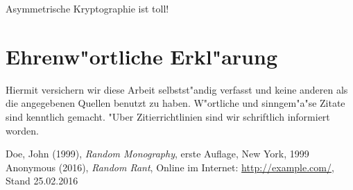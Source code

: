 \documentclass[a4paper, fontsize=12pt, toc=bibliographynumbered]{scrreprt}
\begin{document}
Asymmetrische Kryptographie ist toll!

\author{}
\chapter{Ehrenw"ortliche Erkl"arung}

Hiermit versichern wir diese Arbeit selbstst"andig verfasst und keine
anderen als die angegebenen Quellen benutzt zu haben.  W"ortliche und
sinngem"a"se Zitate sind kenntlich gemacht.  "Uber Zitierrichtlinien
sind wir schriftlich informiert worden.

\renewcommand{\bibname}{Quellenverzeichnis}
\begin{thebibliography}{9}
 Doe, John (1999), \emph{Random Monography}, erste
  Auflage, New York, 1999
 Anonymous (2016), \emph{Random Rant}, Online im
  Internet: \url{http://example.com/}, Stand 25.02.2016
\end{thebibliography}
\end{document}
